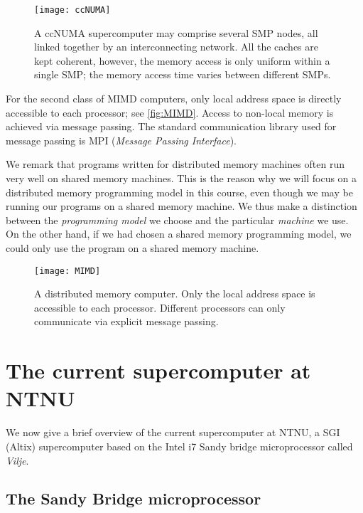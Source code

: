 \begin{figure}[htbp]
  \begin{center}
    \texttt{[image: ccNUMA]}
  \end{center}
  \caption{
    A ccNUMA supercomputer may comprise several SMP nodes, all linked together
    by an interconnecting network. All the caches are kept coherent, however,
    the memory access is only uniform within a single SMP; the memory access
    time varies between different SMPs.
  }
  \label{fig:ccNUMA}
\end{figure}

For the second class of MIMD computers, only local address space is directly
accessible to each processor; see \autoref{fig:MIMD}. Access to non-local memory
is achieved via message passing. The standard communication library used for
message passing is MPI (\emph{Message Passing Interface}).

We remark that programs written for distributed memory machines often run very
well on shared memory machines. This is the reason why we will focus on a
distributed memory programming model in this course, even though we may be
running our programs on a shared memory machine. We thus make a distinction
between the \emph{programming model} we choose and the particular \emph
{machine} we use. On the other hand, if we had chosen a shared memory
programming model, we could only use the program on a shared memory machine.

\begin{figure}[htbp]
  \begin{center}
    \texttt{[image: MIMD]}
  \end{center}
  \caption{
    A distributed memory computer. Only the local address space is accessible to
    each processor. Different processors can only communicate via explicit
    message passing.
  }
  \label{fig:MIMD}
\end{figure}

\section{The current supercomputer at NTNU}

We now give a brief overview of the current supercomputer at NTNU, a SGI (Altix)
supercomputer based on the Intel i7 Sandy bridge microprocessor called
\emph{Vilje}.

\subsection{The Sandy Bridge microprocessor}


